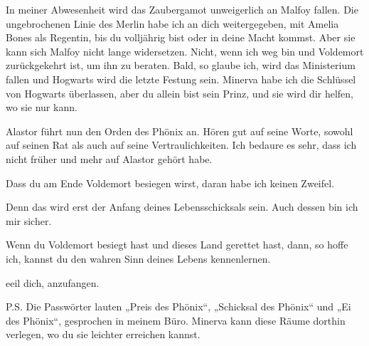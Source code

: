 \begin{writtenNote}
In meiner Abwesenheit wird das Zaubergamot unweigerlich an Malfoy fallen. Die ungebrochenen Linie des Merlin habe ich an dich weitergegeben, mit Amelia Bones als Regentin, bis du volljährig bist oder in deine Macht kommst. Aber sie kann sich Malfoy nicht lange widersetzen. Nicht, wenn ich weg bin und Voldemort zurückgekehrt ist, um ihn zu beraten. Bald, so glaube ich, wird das Ministerium fallen und Hogwarts wird die letzte Festung sein. Minerva habe ich die Schlüssel von Hogwarts überlassen, aber du allein bist sein Prinz, und sie wird dir helfen, wo sie nur kann.

Alastor führt nun den Orden des Phönix an. Hören gut auf seine Worte, sowohl auf seinen Rat als auch auf seine Vertraulichkeiten. Ich bedaure es sehr, dass ich nicht früher und mehr auf Alastor gehört habe.

Dass du am Ende Voldemort besiegen wirst, daran habe ich keinen Zweifel.

Denn das wird erst der Anfang deines Lebensschicksals sein. Auch dessen bin ich mir sicher.

Wenn du Voldemort besiegt hast und dieses Land gerettet hast, dann, so hoffe ich, kannst du den wahren Sinn deines Lebens kennenlernen.

eeil dich, anzufangen.


P.S. Die Passwörter lauten „Preis des Phönix“, „Schicksal des Phönix“ und „Ei des Phönix“, gesprochen in meinem Büro. Minerva kann diese Räume dorthin verlegen, wo du sie leichter erreichen kannst.
\end{writtenNote}

